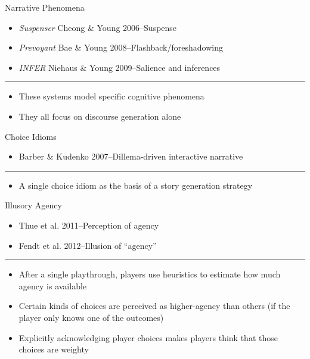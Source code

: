 \documentclass[xcolor=x11names]{beamer}
\newcommand{\work}[1]{\textit{#1}\xspace}
\begin{document}
\begin{frame}{Narrative Phenomena}
  \begin{itemize}
    \item \work{Suspenser} Cheong \& Young 2006--Suspense
    \item \work{Prevoyant} Bae \& Young 2008--Flashback/foreshadowing
    \item \work{INFER} Niehaus \& Young 2009--Salience and inferences
  \end{itemize}
  \hrule
  \begin{itemize}
    \item These systems model specific cognitive phenomena
    \item They all focus on discourse generation alone
  \end{itemize}
\end{frame}

\begin{frame}{Choice Idioms}
  \begin{itemize}
    \item Barber \& Kudenko 2007--Dillema-driven interactive narrative
  \end{itemize}
  \hrule
  \begin{itemize}
    \item A single choice idiom as the basis of a story generation strategy
  \end{itemize}
\end{frame}

\begin{frame}{Illusory Agency}
  \begin{itemize}
    \item Thue et al. 2011--Perception of agency
    \item Fendt et al. 2012--Illusion of ``agency''
  \end{itemize}
  \hrule
  \begin{itemize}
    \item After a single playthrough, players use heuristics to estimate how much agency is available
    \item Certain kinds of choices are perceived as higher-agency than others (if the player only knows one of the outcomes)
    \item Explicitly acknowledging player choices makes players think that those choices are weighty
  \end{itemize}
\end{frame}
\end{document}
